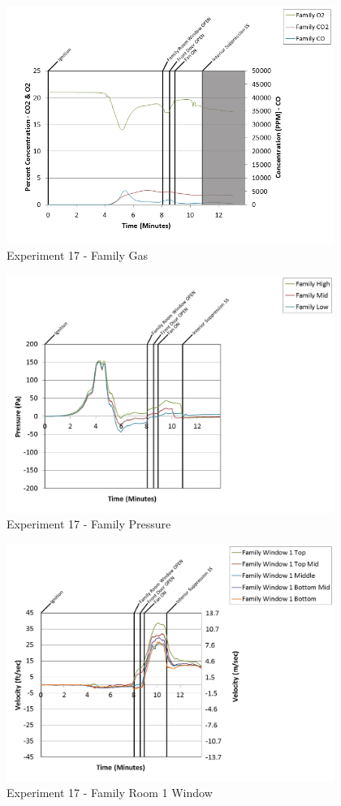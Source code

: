 \documentclass{article}
\begin{document}
\begin{appendices}
\begin{figure}[h!]
	\centering
	\includegraphics[height=3.05in]{0_Images/Results_Charts/Exp_17_Charts/FamilyGas.png}
	\caption{Experiment 17 - Family Gas}
\end{figure}

\clearpage

\begin{figure}[h!]
	\centering
	\includegraphics[height=3.05in]{0_Images/Results_Charts/Exp_17_Charts/FamilyPressure.png}
	\caption{Experiment 17 - Family Pressure}
\end{figure}


\begin{figure}[h!]
	\centering
	\includegraphics[height=3.05in]{0_Images/Results_Charts/Exp_17_Charts/FamilyRoom1Window.png}
	\caption{Experiment 17 - Family Room 1 Window}
\end{figure}


\end{appendices}
\end{document}

